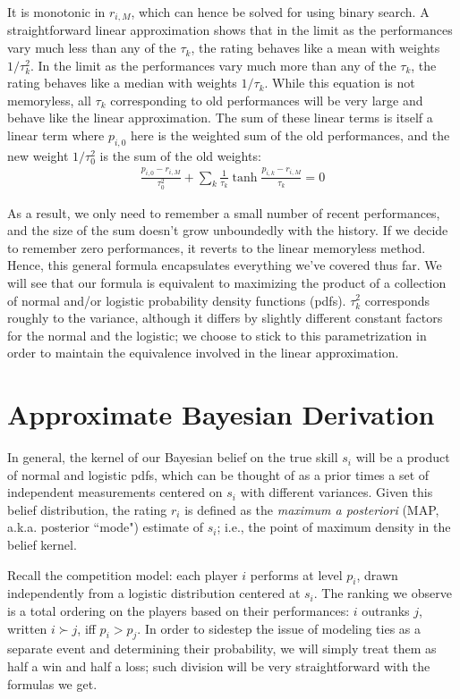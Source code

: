 \documentclass{article}
\begin{document}
It is monotonic in $r_{i,M}$, which can hence be solved for using binary search. A straightforward linear approximation shows that in the limit as the performances vary much less than any of the $\tau_k$, the rating behaves like a mean with weights $1/\tau_k^2$. In the limit as the performances vary much more than any of the $\tau_k$, the rating behaves like a median with weights $1/\tau_k$. While this equation is not memoryless, all $\tau_k$ corresponding to old performances will be very large and behave like the linear approximation. The sum of these linear terms is itself a linear term where $p_{i,0}$ here is the weighted sum of the old performances, and the new weight $1/\tau_0^2$ is the sum of the old weights:
\begin{align}
\frac{p_{i,0} - r_{i,M}}{\tau_0^2} + \sum_k \frac {1}{\tau_k} \tanh\frac{p_{i,k} - r_{i,M}}{\tau_k} = 0
\end{align}

As a result, we only need to remember a small number of recent performances, and the size of the sum doesn't grow unboundedly with the history. If we decide to remember zero performances, it reverts to the linear memoryless method. Hence, this general formula encapsulates everything we've covered thus far. We will see that our formula is equivalent to maximizing the product of a collection of normal and/or logistic probability density functions (pdfs). $\tau_k^2$ corresponds roughly to the variance, although it differs by slightly different constant factors for the normal and the logistic; we choose to stick to this parametrization in order to maintain the equivalence involved in the linear approximation.

\section{Approximate Bayesian Derivation}

In general, the kernel of our Bayesian belief on the true skill $s_i$ will be a product of normal and logistic pdfs, which can be thought of as a prior times a set of independent measurements centered on $s_i$ with different variances. Given this belief distribution, the rating $r_i$ is defined as the \emph{maximum a posteriori} (MAP, a.k.a. posterior ``mode") estimate of $s_i$; i.e., the point of maximum density in the belief kernel.

Recall the competition model: each player $i$ performs at level $p_i$, drawn independently from a logistic distribution centered at $s_i$. The ranking we observe is a total ordering on the players based on their performances: $i$ outranks $j$, written $i \succ j$, iff $p_i > p_j$. In order to sidestep the issue of modeling ties as a separate event and determining their probability, we will simply treat them as half a win and half a loss; such division will be very straightforward with the formulas we get.
\end{document}
